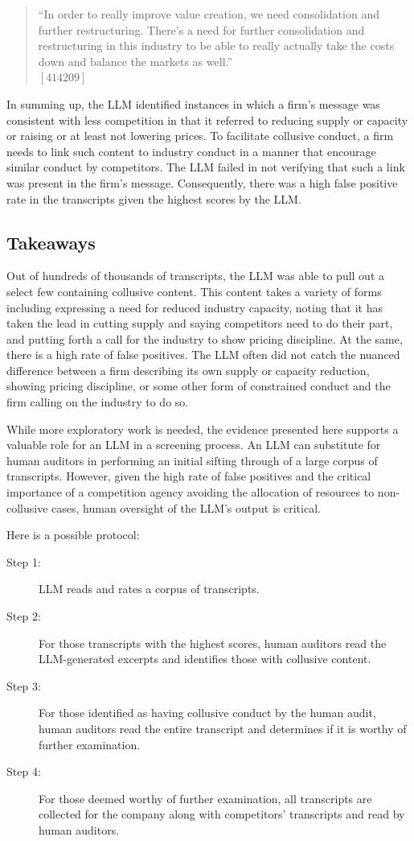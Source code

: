 \begin{quote}
``In order to really improve value creation, we need consolidation and further restructuring. There’s a need for further consolidation and restructuring in this industry to be able to really actually take the costs down and balance the markets as well.'' \\
$[414209]$
\end{quote}

In summing up, the LLM identified instances in which a firm’s message was consistent with less competition in that it referred to reducing supply or capacity or raising or at least not lowering prices. To facilitate collusive conduct, a firm needs to link such content to industry conduct in a manner that encourage similar conduct by competitors. The LLM failed in not verifying that such a link was present in the firm’s message. Consequently, there was a high false positive rate in the transcripts given the highest scores by the LLM.

\subsection{Takeaways}
Out of hundreds of thousands of transcripts, the LLM was able to pull out a select few containing collusive content. This content takes a variety of forms including expressing a need for reduced industry capacity, noting that it has taken the lead in cutting supply and saying competitors need to do their part, and putting forth a call for the industry to show pricing discipline. At the same, there is a high rate of false positives. The LLM often did not catch the nuanced difference between a firm describing its own supply or capacity reduction, showing pricing discipline, or some other form of constrained conduct and the firm calling on the industry to do so.

While more exploratory work is needed, the evidence presented here supports a valuable role for an LLM in a screening process. An LLM can substitute for human auditors in performing an initial sifting through of a large corpus of transcripts. However, given the high rate of false positives and the critical importance of a competition agency avoiding the allocation of resources to non-collusive cases, human oversight of the LLM’s output is critical.

Here is a possible protocol:
\begin{description}
    \item[Step 1:] LLM reads and rates a corpus of transcripts.
    \item[Step 2:] For those transcripts with the highest scores, human auditors read the LLM-generated excerpts and identifies those with collusive content.
    \item[Step 3:] For those identified as having collusive conduct by the human audit, human auditors read the entire transcript and determines if it is worthy of further examination.
    \item[Step 4:] For those deemed worthy of further examination, all transcripts are collected for the company along with competitors’ transcripts and read by human auditors.
\end{description}

